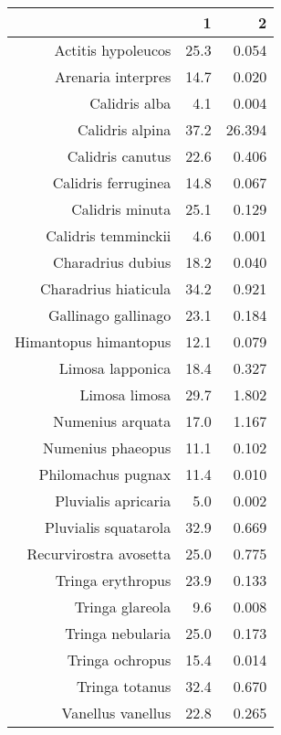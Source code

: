 \begin{table}[ht]
\centering
\begin{tabular}{rrr}
  \hline
 & 1 & 2 \\ 
  \hline
Actitis hypoleucos & 25.3 & 0.054 \\ 
  Arenaria interpres & 14.7 & 0.020 \\ 
  Calidris alba & 4.1 & 0.004 \\ 
  Calidris alpina & 37.2 & 26.394 \\ 
  Calidris canutus & 22.6 & 0.406 \\ 
  Calidris ferruginea & 14.8 & 0.067 \\ 
  Calidris minuta & 25.1 & 0.129 \\ 
  Calidris temminckii & 4.6 & 0.001 \\ 
  Charadrius dubius & 18.2 & 0.040 \\ 
  Charadrius hiaticula & 34.2 & 0.921 \\ 
  Gallinago gallinago & 23.1 & 0.184 \\ 
  Himantopus himantopus & 12.1 & 0.079 \\ 
  Limosa lapponica & 18.4 & 0.327 \\ 
  Limosa limosa & 29.7 & 1.802 \\ 
  Numenius arquata & 17.0 & 1.167 \\ 
  Numenius phaeopus & 11.1 & 0.102 \\ 
  Philomachus pugnax & 11.4 & 0.010 \\ 
  Pluvialis apricaria & 5.0 & 0.002 \\ 
  Pluvialis squatarola & 32.9 & 0.669 \\ 
  Recurvirostra avosetta & 25.0 & 0.775 \\ 
  Tringa erythropus & 23.9 & 0.133 \\ 
  Tringa glareola & 9.6 & 0.008 \\ 
  Tringa nebularia & 25.0 & 0.173 \\ 
  Tringa ochropus & 15.4 & 0.014 \\ 
  Tringa totanus & 32.4 & 0.670 \\ 
  Vanellus vanellus & 22.8 & 0.265 \\ 
   \hline
\end{tabular}
\end{table}
